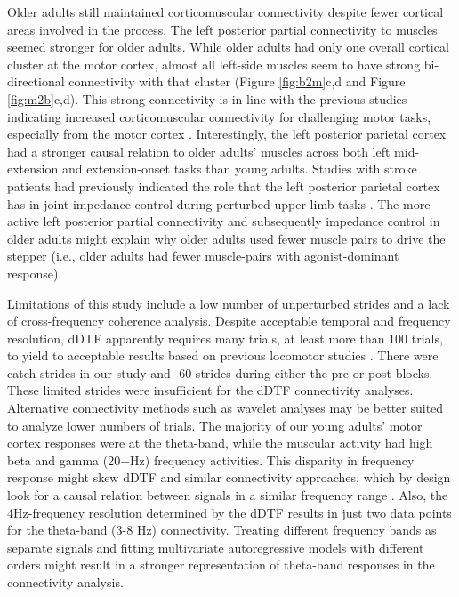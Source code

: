 \documentclass[../thesis_seyed.tex]{subfiles}
\begin{document}
Older adults still maintained corticomuscular connectivity despite fewer cortical areas involved in the process. The left posterior partial connectivity to muscles seemed stronger for older adults. While older adults had only one overall cortical cluster at the motor cortex, almost all left-side muscles seem to have strong bi-directional connectivity with that cluster (Figure \ref{fig:b2m}c,d and Figure \ref{fig:m2b}c,d). This strong connectivity is in line with the previous studies indicating increased corticomuscular connectivity for challenging motor tasks, especially from the motor cortex \cite{Johnson2012-fv,Kamp2013-ga}. Interestingly, the left posterior parietal cortex had a stronger causal relation to older adults’ muscles across both left mid-extension and extension-onset tasks than young adults. Studies with stroke patients had previously indicated the role that the left posterior parietal cortex has in joint impedance control during perturbed upper limb tasks \cite{Mutha2014-ea,Mutha2012-ep}. The more active left posterior partial connectivity and subsequently impedance control in older adults might explain why older adults used fewer muscle pairs to drive the stepper (i.e., older adults had fewer muscle-pairs with agonist-dominant response).

Limitations of this study include a low number of unperturbed strides and a lack of cross-frequency coherence analysis. Despite acceptable temporal and frequency resolution, dDTF apparently requires many trials, at least more than 100 trials, to yield to acceptable results based on previous locomotor studies \cite{Artoni2017-it,Peterson2019-wz}. There were  catch strides in our study and -60 strides during either the pre or post blocks. These limited strides were insufficient for the dDTF connectivity analyses. Alternative connectivity methods such as wavelet analyses may be better suited to analyze lower numbers of trials. The majority of our young adults’ motor cortex responses were at the theta-band, while the muscular activity had high beta and gamma (20+Hz) frequency activities. This disparity in frequency response might skew dDTF and similar connectivity approaches, which by design look for a causal relation between signals in a similar frequency range \cite{Korzeniewska2003-ol}. Also, the 4Hz-frequency resolution determined by the dDTF results in just two data points for the theta-band (3-8 Hz) connectivity. Treating different frequency bands as separate signals and fitting multivariate autoregressive models with different orders might result in a stronger representation of theta-band responses in the connectivity analysis.
\end{document}
